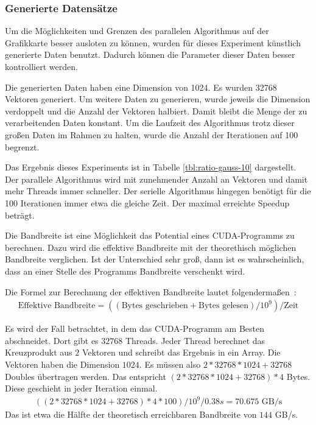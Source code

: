 \documentclass[ngerman]{scrartcl}
\begin{document}
\subsubsection{Generierte Datensätze}
Um die Möglichkeiten und Grenzen des parallelen Algorithmus auf der Grafikkarte besser ausloten zu können, wurden für dieses Experiment künstlich generierte Daten benutzt.
Dadurch können die Parameter dieser Daten besser kontrolliert werden.

Die generierten Daten haben eine Dimension von 1024. Es wurden 32768 Vektoren generiert. Um weitere Daten zu generieren, wurde jeweils die Dimension verdoppelt und die Anzahl der Vektoren halbiert. Damit bleibt die Menge der zu verarbeitenden Daten konstant. Um die Laufzeit des Algorithmus trotz dieser großen Daten im Rahmen zu halten, wurde die Anzahl der Iterationen auf 100 begrenzt.

Das Ergebnis dieses Experiments ist in Tabelle \ref{tbl:ratio-gauss-10} dargestellt. Der parallele Algorithmus wird mit zunehmender Anzahl an Vektoren und damit mehr Threads immer schneller. Der serielle Algorithmus hingegen benötigt für die 100 Iterationen immer etwa die gleiche Zeit. Der maximal erreichte Speedup beträgt. %


Die Bandbreite ist eine Möglichkeit das Potential eines CUDA-Programms zu berechnen. Dazu wird die effektive Bandbreite mit der theorethisch möglichen Bandbreite verglichen.
Ist der Unterschied sehr groß, dann ist es wahrscheinlich, dass an einer Stelle des Programms Bandbreite verschenkt wird.

Die Formel zur Berechnung der effektiven Bandbreite lautet folgendermaßen~\cite{cudabestpracticeguide}:
\begin{align}
\text{Effektive Bandbreite} = (( \text{Bytes geschrieben} + \text{Bytes gelesen} ) / 10^9 ) / \text{Zeit}
\end{align}

Es wird der Fall betrachtet, in dem das CUDA-Programm am Besten abschneidet. 
Dort gibt es $ 32768$ Threads. Jeder Thread berechnet das Kreuzprodukt aus $2$ Vektoren und schreibt das Ergebnis in ein Array. Die Vektoren haben die Dimension $1024$. Es müssen also $2 * 32768 * 1024 + 32768$ Doubles übertragen werden. Das entspricht $(2 * 32768 * 1024 + 32768) * 4$ Bytes. Diese geschieht in jeder Iteration einmal. 
\begin{align}
((2 * 32768 * 1024 + 32768) * 4 * 100) / 10^9 / 0.38s = 70.675 \text{ GB/s}
\end{align}
Das ist etwa die Hälfte der theoretisch erreichbaren Bandbreite von $144$ GB/s.
\end{document}
